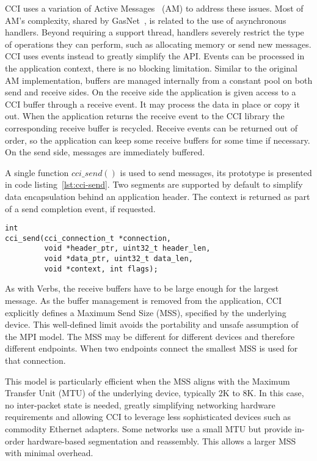 CCI uses a variation of Active Messages~\cite{voneicken-isca92} (AM) 
to address these issues. 
Most of AM's complexity, shared by GasNet~\cite{gasnet}, is related 
to the use of asynchronous handlers. Beyond requiring a support thread, handlers severely restrict the type of operations they can perform, such as allocating memory or send new messages. CCI uses events instead to greatly simplify the API. Events can be processed in the application context, there is no blocking limitation. Similar to the original AM implementation, buffers are managed 
internally from a constant pool on both send and receive sides. 
On the receive side the application is given access to a CCI buffer through 
a receive event. It may process the data in place or copy it out. When the 
application returns the receive event to the CCI library the corresponding 
receive buffer is recycled. Receive events can be returned out of order, so 
the application can keep some receive buffers for some time if necessary. 
On the send side, messages are immediately buffered.

A single function $cci\_send()$ is used to send messages, its prototype is presented in code listing~\ref{lst:cci-send}. Two segments are supported by default to simplify data encapsulation behind an application header. The context is returned as part of a send completion event, if requested.

\begin{lstlisting}[label=lst:cci-send,caption=CCI send prototype]
int 
cci_send(cci_connection_t *connection, 
         void *header_ptr, uint32_t header_len, 
         void *data_ptr, uint32_t data_len, 
         void *context, int flags);
\end{lstlisting}

As with Verbs, the receive buffers have to be large enough for the largest 
message. As the buffer management is removed from the application, CCI 
explicitly defines a Maximum Send Size (MSS), specified by the underlying  
device. This well-defined limit avoids the portability and unsafe assumption 
of the MPI model. The MSS may be different for 
different devices and therefore different endpoints. When two endpoints 
connect the smallest MSS is used for that connection.

This model is particularly efficient when the MSS aligns with the Maximum 
Transfer Unit (MTU) of the underlying device, typically 2K to 8K. 
In this case, no inter-packet state is needed, greatly simplifying
networking hardware requirements and allowing CCI to leverage less 
sophisticated devices such as commodity Ethernet adapters. 
Some networks use a small MTU but provide in-order hardware-based segmentation and reassembly. This allows a larger MSS with minimal overhead.

